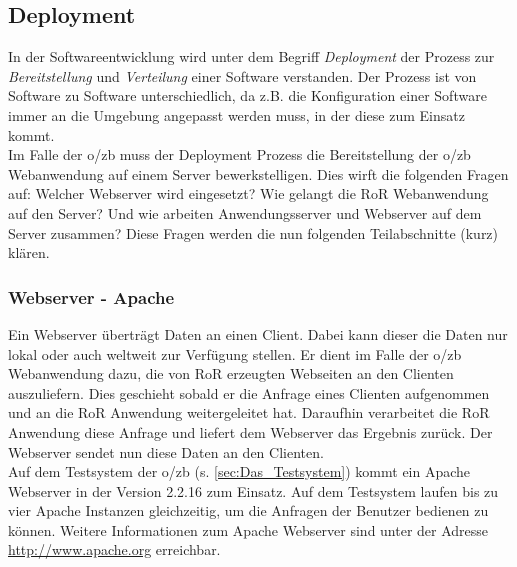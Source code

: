\documentclass[12pt,             %
               a4paper,          %
               listof=totoc,     %
               index=totoc,      %
               bibliography=totoc,%
               oneside,         %
               BCOR1cm,          %
               english   %
               ]{scrbook}
\begin{document}
\subsection{Deployment}\label{sec:deployment}
In der Softwareentwicklung wird unter dem Begriff \textit{Deployment} der Prozess zur \textit{Bereitstellung} und \textit{Verteilung} einer Software verstanden. Der Prozess ist von Software zu Software unterschiedlich, da z.B. die Konfiguration einer Software immer an die Umgebung angepasst werden muss, in der diese zum Einsatz kommt.\\

Im Falle der o/zb muss der Deployment Prozess die Bereitstellung der o/zb Webanwendung auf einem Server bewerkstelligen. Dies wirft die folgenden Fragen auf: Welcher Webserver wird eingesetzt? Wie gelangt die RoR Webanwendung auf den Server? Und wie arbeiten Anwendungsserver und Webserver auf dem Server zusammen? Diese Fragen werden die nun folgenden Teilabschnitte (kurz) klären.

\subsubsection{Webserver - Apache}
Ein Webserver überträgt Daten an einen Client. Dabei kann dieser die Daten nur lokal oder auch weltweit zur Verfügung stellen. Er dient im Falle der o/zb Webanwendung dazu, die von RoR erzeugten Webseiten an den Clienten auszuliefern. Dies geschieht sobald er die Anfrage eines Clienten aufgenommen und an die RoR Anwendung weitergeleitet hat. Daraufhin verarbeitet die RoR Anwendung diese Anfrage und liefert dem Webserver das Ergebnis zurück. Der Webserver sendet nun diese Daten an den Clienten.\\

Auf dem Testsystem der o/zb (s. \vref{sec:Das_Testsystem}) kommt ein Apache Webserver in der Version 2.2.16 zum Einsatz. Auf dem Testsystem laufen bis zu vier Apache Instanzen gleichzeitig, um die Anfragen der Benutzer bedienen zu können. Weitere Informationen zum Apache Webserver sind unter der Adresse \url{http://www.apache.org} erreichbar.
\end{document}
